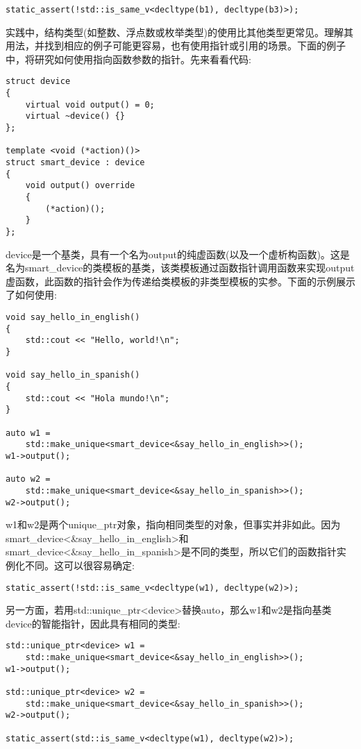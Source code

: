 \begin{lstlisting}[style=styleCXX]
static_assert(!std::is_same_v<decltype(b1), decltype(b3)>);
\end{lstlisting}

实践中，结构类型(如整数、浮点数或枚举类型)的使用比其他类型更常见。理解其用法，并找到相应的例子可能更容易，也有使用指针或引用的场景。下面的例子中，将研究如何使用指向函数参数的指针。先来看看代码:

\begin{lstlisting}[style=styleCXX]
struct device
{
	virtual void output() = 0;
	virtual ~device() {}
};

template <void (*action)()>
struct smart_device : device
{
	void output() override
	{
		(*action)();
	}
};
\end{lstlisting}

device是一个基类，具有一个名为output的纯虚函数(以及一个虚析构函数)。这是名为smart\_device的类模板的基类，该类模板通过函数指针调用函数来实现output虚函数，此函数的指针会作为传递给类模板的非类型模板的实参。下面的示例展示了如何使用:

\begin{lstlisting}[style=styleCXX]
void say_hello_in_english()
{
	std::cout << "Hello, world!\n";
}

void say_hello_in_spanish()
{
	std::cout << "Hola mundo!\n";
}

auto w1 =
	std::make_unique<smart_device<&say_hello_in_english>>();
w1->output();

auto w2 =
	std::make_unique<smart_device<&say_hello_in_spanish>>();
w2->output();
\end{lstlisting}

w1和w2是两个unique\_ptr对象，指向相同类型的对象，但事实并非如此。因为smart\_device<\&say\_hello\_in\_english>和smart\_device<\&say\_hello\_in\_spanish>是不同的类型，所以它们的函数指针实例化不同。这可以很容易确定:

\begin{lstlisting}[style=styleCXX]
static_assert(!std::is_same_v<decltype(w1), decltype(w2)>);
\end{lstlisting}

另一方面，若用std::unique\_ptr<device>替换auto，那么w1和w2是指向基类device的智能指针，因此具有相同的类型:

\begin{lstlisting}[style=styleCXX]
std::unique_ptr<device> w1 =
	std::make_unique<smart_device<&say_hello_in_english>>();
w1->output();

std::unique_ptr<device> w2 =
	std::make_unique<smart_device<&say_hello_in_spanish>>();
w2->output();

static_assert(std::is_same_v<decltype(w1), decltype(w2)>);
\end{lstlisting}

